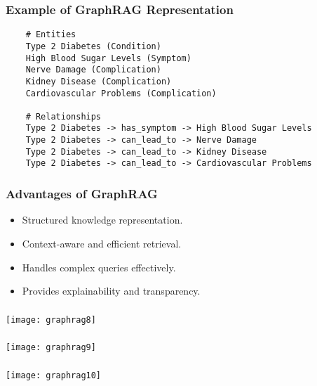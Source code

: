 \begin{frame}[fragile]\frametitle{Example of GraphRAG Representation}
    \begin{lstlisting}
    # Entities
    Type 2 Diabetes (Condition)
    High Blood Sugar Levels (Symptom)
    Nerve Damage (Complication)
    Kidney Disease (Complication)
    Cardiovascular Problems (Complication)

    # Relationships
    Type 2 Diabetes -> has_symptom -> High Blood Sugar Levels
    Type 2 Diabetes -> can_lead_to -> Nerve Damage
    Type 2 Diabetes -> can_lead_to -> Kidney Disease
    Type 2 Diabetes -> can_lead_to -> Cardiovascular Problems
    \end{lstlisting}
\end{frame}


\begin{frame}[fragile]\frametitle{Advantages of GraphRAG}
    \begin{itemize}
        \item Structured knowledge representation.
        \item Context-aware and efficient retrieval.
        \item Handles complex queries effectively.
        \item Provides explainability and transparency.
    \end{itemize}
\end{frame}

\begin{frame}[fragile]\frametitle{}

	\begin{center}
	\texttt{[image: graphrag8]}
	\end{center}
	
\end{frame}


\begin{frame}[fragile]\frametitle{}

	\begin{center}
	\texttt{[image: graphrag9]}
	\end{center}
	
\end{frame}

\begin{frame}[fragile]\frametitle{}

	\begin{center}
	\texttt{[image: graphrag10]}
	\end{center}
	
\end{frame}

